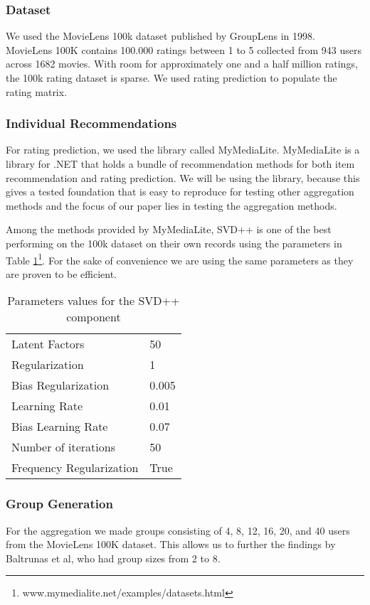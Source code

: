 \subsubsection{Dataset}\label{sec:dataset}
We used the MovieLens 100k dataset published by GroupLens in 1998\cite{movielens100k}. MovieLens 100K contains 100.000 ratings between 1 to 5 collected from 943 users across 1682 movies. With room for approximately one and a half million ratings, the 100k rating dataset is sparse. We used rating prediction to populate the rating matrix.

\subsubsection{Individual Recommendations}\label{sec:individualrecommendation}
For rating prediction, we used the library called MyMediaLite\cite{mymedialite}. MyMediaLite is a library for .NET that holds a bundle of recommendation methods for both item recommendation and rating prediction. We will be using the library, because this gives a tested foundation that is easy to reproduce for testing other aggregation methods and the focus of our paper lies in testing the aggregation methods.

Among the methods provided by MyMediaLite, SVD++ is one of the best performing on the 100k dataset on their own records using the parameters in Table \ref{tbl:svdpp}\footnote{www.mymedialite.net/examples/datasets.html}. For the sake of convenience we are using the same parameters as they are proven to be efficient.

\begin{table}[H]
	\centering
	\begin{tabular}{|l|l|}\hline
		Latent Factors & 50 \\
		Regularization & 1	\\
		Bias Regularization & 0.005	\\
		Learning Rate & 0.01 \\
		Bias Learning Rate & 0.07 \\ 
		Number of iterations & 50 \\
		Frequency Regularization & True \\\hline
	\end{tabular}
	\caption{Parameters values for the SVD++ component}
	\label{tbl:svdpp}
\end{table}

\subsubsection{Group Generation}\label{sec:groupgeneration}
For the aggregation we made groups consisting of 4, 8, 12, 16, 20, and 40 users from the MovieLens 100K dataset. This allows us to further the findings by Baltrunas et al\cite{Baltrunas:2010:GRR:1864708.1864733}, who had group sizes from 2 to 8.

